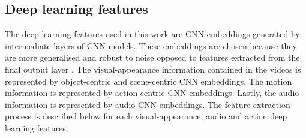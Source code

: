 \documentclass[review]{elsarticle}
\begin{document}
\subsection{Deep learning features}
The deep learning features used in this work are \ac{CNN} embeddings generated by intermediate layers of \ac{CNN} models. These embeddings are chosen because they are more generalised and robust to noise opposed to features extracted from the final output layer \citep{holzenberger2019learning, kalliatakis2019exploring}. The visual-appearance information contained in the videos is represented by object-centric and scene-centric \ac{CNN} embeddings. The motion information is represented by action-centric \ac{CNN} embeddings. Lastly, the audio information is represented by audio \ac{CNN} embeddings. The feature extraction process is described below for each visual-appearance, audio and action deep learning features.
\end{document}
